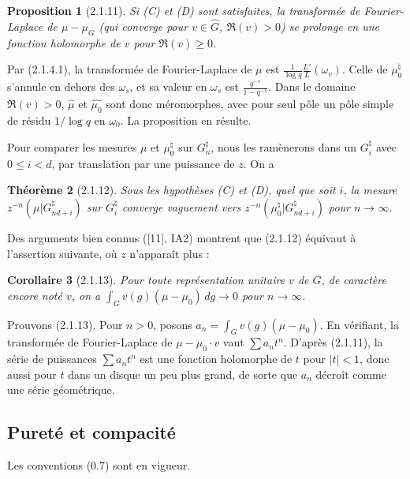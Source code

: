 \documentclass[12pt,a4paper]{article}
\theoremstyle{plain}
\newtheorem{theorem}{Th\'eor\`eme}[section]
\newtheorem{proposition}[theorem]{Proposition}
\newtheorem{corollary}[theorem]{Corollaire}
\theoremstyle{definition}
\theoremstyle{remark}
\begin{document}
\begin{proposition}[2.1.11]
Si (C) et (D) sont satisfaites, la transform\'ee de Fourier-Laplace de $\mu - \mu_G$ (qui converge pour $v \in \widehat{G}$, $\Re(v) > 0$) se prolonge en une fonction holomorphe de $v$ pour $\Re(v) \geq 0$.
\end{proposition}

Par (2.1.4.1), la transform\'ee de Fourier-Laplace de $\mu$ est $\frac{1}{\log q} \frac{L'}{L}(\omega_v)$. Celle de $\mu_0^\natural$ s'annule en dehors des $\omega_s$, et sa valeur en $\omega_s$ est $\frac{q^{-s}}{1 - q^{-s}}$. Dans le domaine $\Re(v) > 0$, $\widehat{\mu}$ et $\widehat{\mu_0}$ sont donc m\'eromorphes, avec pour seul p\^ole un p\^ole simple de r\'esidu $1/\log q$ en $\omega_0$. La proposition en r\'esulte.

Pour comparer les mesures $\mu$ et $\mu_0^\natural$ sur $G_n^\natural$, nous les ram\`enerons dans un $G_i^\natural$ avec $0 \leq i < d$, par translation par une puissance de $z$. On a

\begin{theorem}[2.1.12]
Sous les hypoth\`eses (C) et (D), quel que soit $i$, la mesure $z^{-n}(\mu|G_{nd+i}^\natural)$ sur $G_i^\natural$ converge vaguement vers $z^{-n}(\mu_0^\natural|G_{nd+i}^\natural)$ pour $n \to \infty$.
\end{theorem}

Des arguments bien connus ([11], IA2) montrent que (2.1.12) \'equivaut \`a l'assertion suivante, o\`u $z$ n'appara\^it plus :

\begin{corollary}[2.1.13]
Pour toute repr\'esentation unitaire $v$ de $G$, de caract\`ere encore not\'e $v$, on a $\int_G v(g)(\mu - \mu_0)\, dg \to 0$ pour $n \to \infty$.
\end{corollary}

Prouvons (2.1.13). Pour $n > 0$, posons $a_n = \int_G v(g)(\mu - \mu_0)$. En v\'erifiant, la transform\'ee de Fourier-Laplace de $\mu - \mu_0 \cdot v$ vaut $\sum a_n t^n$. D'apr\`es (2.1.11), la s\'erie de puissances $\sum a_n t^n$ est une fonction holomorphe de $t$ pour $|t| < 1$, donc aussi pour $t$ dans un disque un peu plus grand, de sorte que $a_n$ d\'ecro\^it comme une s\'erie g\'eom\'etrique.


\subsection{Puret\'e et compacit\'e}

Les conventions (0.7) sont en vigueur.
\end{document}
